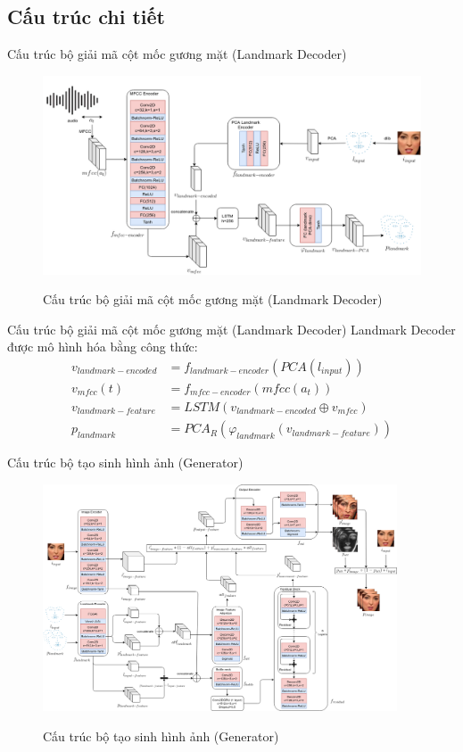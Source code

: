 \subsection{Cấu trúc chi tiết}
\begin{frame}{Cấu trúc bộ giải mã cột mốc gương mặt (Landmark Decoder)}
    \begin{figure}[H]
        \centering
        \includegraphics[width=13cm]{images/landmark_decoder.png}
        \label{fig:landmark_decoder}
        \caption{Cấu trúc bộ giải mã cột mốc gương mặt (Landmark Decoder)}
    \end{figure}
\end{frame}

\begin{frame}{Cấu trúc bộ giải mã cột mốc gương mặt (Landmark Decoder)}
    Landmark Decoder được mô hình hóa bằng công thức:
    \begin{equation}
        \begin{split}
        v_{landmark-encoded} &= f_{landmark-encoder}(PCA(l_{input}))\\
        v_{mfcc}(t) &= f_{mfcc-encoder}(mfcc(a_t))\\
        v_{landmark-feature} &= LSTM(v_{landmark-encoded} \oplus v_{mfcc})\\
        p_{landmark} &= PCA_R(\varphi_{landmark}(v_{landmark-feature}))
        \end{split}
    \end{equation}
\end{frame}

\begin{frame}{Cấu trúc bộ tạo sinh hình ảnh (Generator)}
    \begin{figure}[H]
        \centering
        \includegraphics[width=10.5cm]{images/generator.png}
        \label{fig:generator}
        \caption{Cấu trúc bộ tạo sinh hình ảnh (Generator)}
    \end{figure}
\end{frame}

